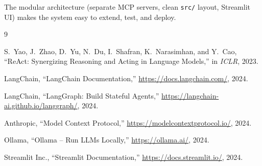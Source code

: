 \documentclass[12pt,a4paper]{article}
\begin{document}
The modular architecture (separate MCP servers, clean \texttt{src/} layout,
Streamlit UI) makes the system easy to extend, test, and deploy.

\begin{thebibliography}{9}

  S.~Yao, J.~Zhao, D.~Yu, N.~Du, I.~Shafran, K.~Narasimhan, and Y.~Cao,
  ``ReAct: Synergizing Reasoning and Acting in Language Models,''
  in \emph{ICLR}, 2023.

  LangChain, ``LangChain Documentation,''
  \url{https://docs.langchain.com/}, 2024.

  LangChain, ``LangGraph: Build Stateful Agents,''
  \url{https://langchain-ai.github.io/langgraph/}, 2024.

  Anthropic, ``Model Context Protocol,''
  \url{https://modelcontextprotocol.io/}, 2024.

  Ollama, ``Ollama – Run LLMs Locally,''
  \url{https://ollama.ai/}, 2024.

  Streamlit Inc., ``Streamlit Documentation,''
  \url{https://docs.streamlit.io/}, 2024.

\end{thebibliography}
\end{document}

